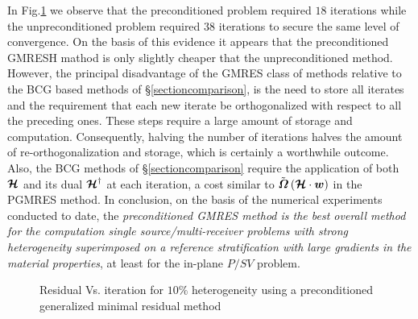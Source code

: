 In Fig.\ref{preconit} we observe that the preconditioned problem required 
$18$ iterations while the unpreconditioned problem required $38$ 
iterations to 
secure the same level of convergence. On the basis of this evidence it 
appears that the preconditioned GMRESH mathod is only slightly cheaper that
the  unpreconditioned method. However, the 
principal disadvantage of the GMRES class of  methods relative to the BCG 
based methods of 
\S\ref{sectioncomparison}, is the need to store all iterates and the 
requirement that each new iterate be orthogonalized with respect to all 
the 
preceding ones. These steps require a large amount of storage and 
computation. Consequently,  halving the number of iterations halves the 
amount of re-orthogonalization and storage, which is certainly a 
worthwhile outcome. Also, the BCG methods of \S\ref{sectioncomparison} 
require the application of both  ${\mbox{\boldmath$\cal H$\unboldmath}}$ and its dual ${\mbox{\boldmath$\cal H$\unboldmath}}^{\dagger}$
at each iteration,  a cost similar to $\tilde{\mbox{\boldmath$\mit \Omega$\unboldmath}}\left({\mbox{\boldmath$\cal H$\unboldmath}}\cdot {\mbox{\boldmath$\mit w$\unboldmath}}\right)$ in the PGMRES method. In conclusion, on the basis 
of the numerical experiments conducted to date, the {\em 
preconditioned GMRES method is the best overall method for the 
computation single source/multi-receiver problems with strong heterogeneity
superimposed on a reference stratification with large gradients in the 
material properties\/}, at least for the in-plane $P/SV$ problem. 


\begin{figure}
\HideDisplacementBoxes
\centerline{}
\caption{Residual Vs. iteration for $10\%$ heterogeneity using a 
preconditioned generalized minimal residual method}
\protect\label{preconit}
\end{figure}






